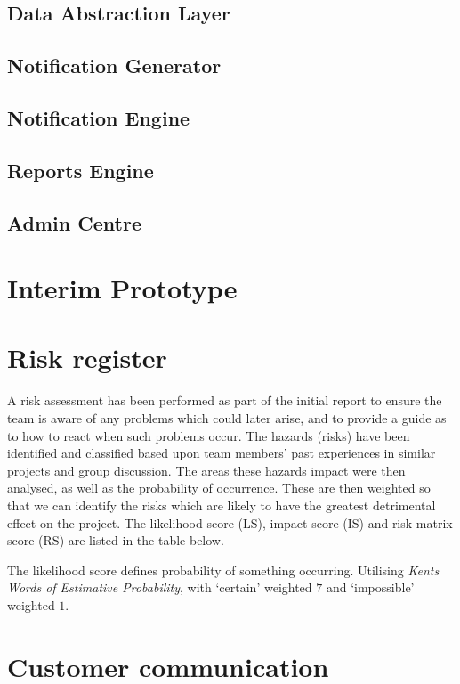 \documentclass[10pt,a4paper]{article}
\begin{document}


\subsection{Data Abstraction Layer}
\subsection{Notification Generator}
\subsection{Notification Engine}
\subsection{Reports Engine}
\subsection{Admin Centre}

\section{Interim Prototype}

\section{Risk register}

A risk assessment has been performed as part of the initial report to ensure the
team is aware of any problems which could later arise, and to provide a guide as
to how to react when such problems occur. The hazards (risks) have been
identified and classified based upon team members' past experiences in similar
projects and group discussion. The areas these hazards impact were then
analysed, as well as the probability of occurrence. These are then weighted so
that we can identify the risks which are likely to have the greatest detrimental
effect on the project. The likelihood score (LS), impact score (IS) and risk matrix score 
(RS) are
listed in the table below.



The likelihood score defines probability of something occurring. Utilising
\textit{Kents Words of Estimative Probability}\cite{kent1966strategic}, with
`certain' weighted $7$ and `impossible' weighted $1$.




\section{Customer communication}

\vfill


\end{document}
